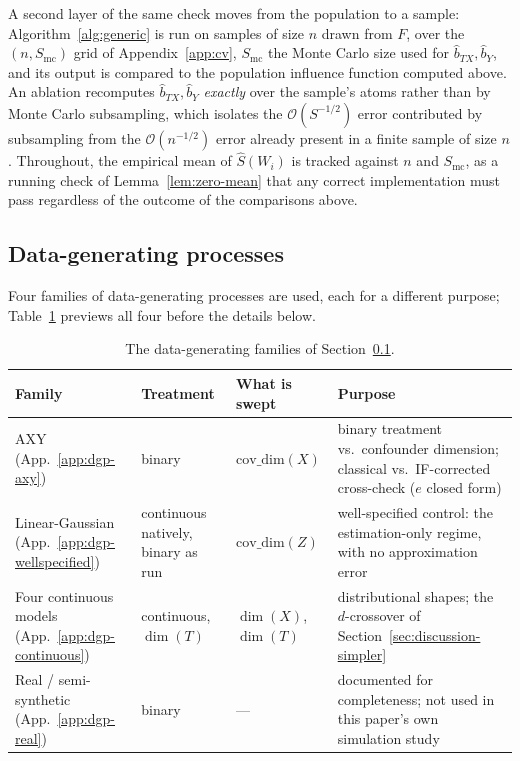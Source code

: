 \documentclass[11pt]{article}
\theoremstyle{plain}
\theoremstyle{definition}
\theoremstyle{remark}
\newcommand{\cO}{\mathcal{O}}
\newcommand{\gps}{e}
\newcommand{\score}{S}
\begin{document}
A second layer of the same check moves from the population to a sample: Algorithm~\ref{alg:generic}
is run on samples of size $n$ drawn from $F$, over the $(n,S_{\mathrm{mc}})$ grid of Appendix~\ref{app:cv},
$S_{\mathrm{mc}}$ the Monte Carlo size used for $\widehat b_{TX},\widehat b_Y$, and its output is compared to
the population influence function computed above. An ablation recomputes $\widehat b_{TX},
\widehat b_Y$ \emph{exactly} over the sample's atoms rather than by Monte Carlo subsampling, which
isolates the $\cO(S^{-1/2})$ error contributed by subsampling from the $\cO(n^{-1/2})$ error
already present in a finite sample of size $n$. Throughout, the empirical mean of
$\widehat\score(W_i)$ is tracked against $n$ and $S_{\mathrm{mc}}$, as a running check of Lemma~\ref{lem:zero-mean}
that any correct implementation must pass regardless of the outcome of the comparisons above.

\subsection{Data-generating processes}
\label{sec:sim-dgp}

Four families of data-generating processes are used, each for a different purpose;
Table~\ref{tab:dgp-overview} previews all four before the details below.

\begin{table}[htbp]
\centering
\small
\begin{tabular}{@{}p{3.3cm}p{1.9cm}p{2.3cm}p{5.5cm}@{}}
\toprule
Family & Treatment & What is swept & Purpose \\
\midrule
AXY (App.~\ref{app:dgp-axy}) & binary & $\mathrm{cov\_dim}(X)$ & binary treatment vs.\ confounder dimension; classical vs.\ IF-corrected cross-check ($\gps$ closed form) \\
Linear-Gaussian (App.~\ref{app:dgp-wellspecified}) & continuous natively, binary as run & $\mathrm{cov\_dim}(Z)$ & well-specified control: the estimation-only regime, with no approximation error \\
Four continuous models (App.~\ref{app:dgp-continuous}) & continuous, $\dim(T)$ & $\dim(X)$, $\dim(T)$ & distributional shapes; the $d$-crossover of Section~\ref{sec:discussion-simpler} \\
Real / semi-synthetic (App.~\ref{app:dgp-real}) & binary & --- & documented for completeness; not used in this paper's own simulation study \\
\bottomrule
\end{tabular}
\caption{The data-generating families of Section~\ref{sec:sim-dgp}.}
\label{tab:dgp-overview}
\end{table}
\end{document}
